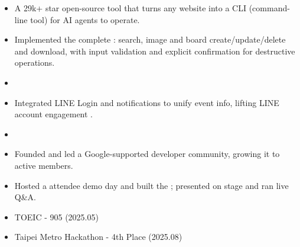 \documentclass[a4paper]{article}
\begin{document}

\begin{itemize}
  \item A 29k+ star open-source tool that turns any website into a CLI (command-line tool) for AI agents to operate.
  \item Implemented the complete : search, image and board create/update/delete and download, with input validation and explicit confirmation for destructive operations.
  \item {}
\end{itemize}

\begin{itemize}
  \item Integrated LINE Login and notifications to unify event info, lifting LINE account engagement .
  \item {}
\end{itemize}


\begin{itemize}
  \item Founded and led a Google-supported developer community, growing it to  active members.
  \item Hosted a  attendee demo day and built the ; presented on stage and ran live Q\&A.
\end{itemize}


\vspace{0pt}

\begin{itemize}
  \item TOEIC - 905 (2025.05)
  \item Taipei Metro Hackathon - 4th Place (2025.08)
\end{itemize}
\end{document}
